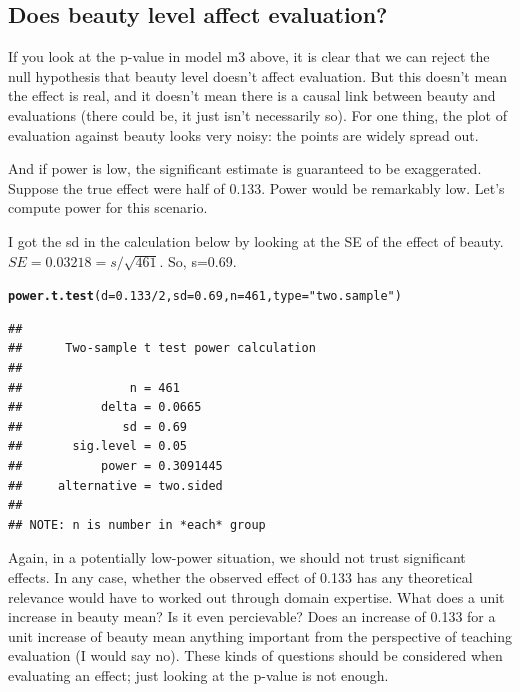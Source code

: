 \documentclass[12pt]{book}\usepackage[]{graphicx}\usepackage[]{color}
\makeatletter
\newcommand{\hlnum}[1]{\textcolor[rgb]{0.686,0.059,0.569}{#1}}%
\newcommand{\hlstr}[1]{\textcolor[rgb]{0.192,0.494,0.8}{#1}}%
\newcommand{\hlopt}[1]{\textcolor[rgb]{0,0,0}{#1}}%
\newcommand{\hlstd}[1]{\textcolor[rgb]{0.345,0.345,0.345}{#1}}%
\newcommand{\hlkwc}[1]{\textcolor[rgb]{0.333,0.667,0.333}{#1}}%
\newcommand{\hlkwd}[1]{\textcolor[rgb]{0.737,0.353,0.396}{\textbf{#1}}}%
\newenvironment{kframe}{%
 \def\at@end@of@kframe{}%
 \ifinner\ifhmode%
  \def\at@end@of@kframe{\end{minipage}}%
  \begin{minipage}{\columnwidth}%
 \fi\fi%
 \def\FrameCommand##1{\hskip\@totalleftmargin \hskip-\fboxsep
 \colorbox{shadecolor}{##1}\hskip-\fboxsep
     \hskip-\linewidth \hskip-\@totalleftmargin \hskip\columnwidth}%
 \MakeFramed {\advance\hsize-\width
   \@totalleftmargin\z@ \linewidth\hsize
   \@setminipage}}%
 {\par\unskip\endMakeFramed%
 \at@end@of@kframe}
\newenvironment{knitrout}{}{} %
\makeatother
\begin{document}
\subsection{Does beauty level affect evaluation?}

If you look at the p-value in model m3 above, it is clear that we can reject the null hypothesis that beauty level doesn't affect evaluation. But this doesn't mean the effect is real, and it doesn't mean there is a causal link between beauty and evaluations (there could be, it just isn't necessarily so). For one thing, the plot of evaluation against beauty looks very noisy: the points are widely spread out. 

And if power is low, the significant estimate is guaranteed to be exaggerated. Suppose the true effect were half of 0.133. Power would be remarkably low. Let's compute power for this scenario.

I got the sd in the calculation below by looking at the SE of the effect of beauty. $SE=0.03218=s/\sqrt{461}$. So, s=0.69.

\begin{knitrout}
\color{fgcolor}\begin{kframe}
\begin{alltt}
\hlkwd{power.t.test}\hlstd{(}\hlkwc{d}\hlstd{=}\hlnum{0.133}\hlopt{/}\hlnum{2}\hlstd{,}\hlkwc{sd}\hlstd{=}\hlnum{0.69}\hlstd{,}\hlkwc{n}\hlstd{=}\hlnum{461}\hlstd{,}\hlkwc{type}\hlstd{=}\hlstr{"two.sample"}\hlstd{)}
\end{alltt}
\begin{verbatim}
## 
##      Two-sample t test power calculation 
## 
##               n = 461
##           delta = 0.0665
##              sd = 0.69
##       sig.level = 0.05
##           power = 0.3091445
##     alternative = two.sided
## 
## NOTE: n is number in *each* group
\end{verbatim}
\end{kframe}
\end{knitrout}

Again, in a potentially low-power situation, we should not trust significant effects. In any case, whether the observed effect of 0.133 has any theoretical relevance would have to worked out through domain expertise. What does a unit increase in beauty mean? Is it even percievable? Does an increase of 0.133  for a unit increase of beauty mean anything important from the perspective of teaching evaluation (I would say no). These kinds of questions should be considered when evaluating an effect; just looking at the p-value is not enough.
\end{document}
